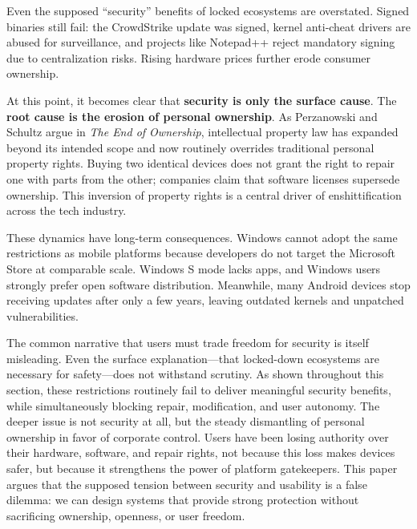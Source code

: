 Even the supposed ``security'' benefits of locked ecosystems are overstated. Signed binaries still fail: the CrowdStrike update was signed, kernel anti‑cheat drivers are abused for surveillance, and projects like Notepad++ reject mandatory signing due to centralization risks\cite{notepadSelfSigned}. Rising hardware prices further erode consumer ownership.

At this point, it becomes clear that \textbf{security is only the surface cause}. The \textbf{root cause is the erosion of personal ownership}. As Perzanowski and Schultz argue in \textit{The End of Ownership}\cite{endofownership}, intellectual property law has expanded beyond its intended scope and now routinely overrides traditional personal property rights. Buying two identical devices does not grant the right to repair one with parts from the other; companies claim that software licenses supersede ownership. This inversion of property rights is a central driver of enshittification across the tech industry.

These dynamics have long‑term consequences. Windows cannot adopt the same restrictions as mobile platforms because developers do not target the Microsoft Store at comparable scale. Windows S mode\cite{MicrosoftSModeFAQ} lacks apps, and Windows users strongly prefer open software distribution\cite{pcgamerUniversalApps, redditRufusUWP}. Meanwhile, many Android devices stop receiving updates after only a few years\cite{androidcentralLinuxKernel}, leaving outdated kernels and unpatched vulnerabilities\cite{androidvulnerabilitiesByYear}.

The common narrative that users must trade freedom for security is itself misleading. Even the surface explanation---that locked-down ecosystems are necessary for safety---does not withstand scrutiny. As shown throughout this section, these restrictions routinely fail to deliver meaningful security benefits, while simultaneously blocking repair, modification, and user autonomy. The deeper issue is not security at all, but the steady dismantling of personal ownership in favor of corporate control. Users have been losing authority over their hardware, software, and repair rights\cite{win11stop}, not because this loss makes devices safer, but because it strengthens the power of platform gatekeepers. This paper argues that the supposed tension between security and usability is a false dilemma\cite{nistUsersNotStupid}: we can design systems that provide strong protection without sacrificing ownership, openness, or user freedom.

